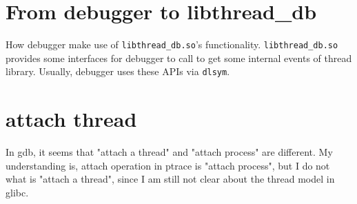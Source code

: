 \section{From debugger to libthread\_db}

How debugger make use of \texttt{libthread\_db.so}'s functionality.
\texttt{libthread\_db.so} provides some interfaces for debugger to call to get some internal
events of thread library.  Usually, debugger uses these APIs via \texttt{dlsym}.

\section{attach thread}
In gdb, it seems that "attach a thread" and "attach process" are different.  My understanding is, attach operation in ptrace is
"attach process", but I do not what is "attach a thread", since I am still not clear about the thread model in glibc.


